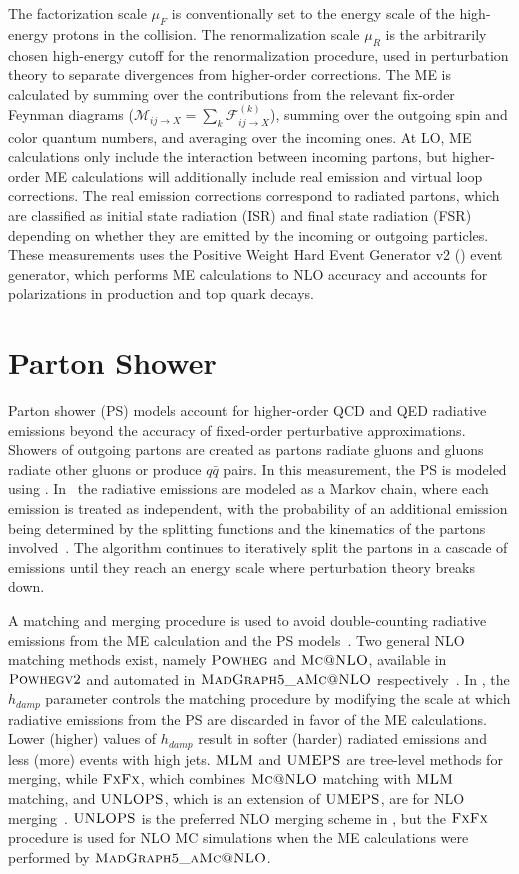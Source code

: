 The factorization scale $\mu_F$ is conventionally set to the energy scale of the high-energy protons in the collision.
The renormalization scale $\mu_R$ is the arbitrarily chosen high-energy cutoff for the renormalization procedure, used in perturbation theory to separate divergences from higher-order corrections.
The ME is calculated by summing over the contributions from the relevant fix-order Feynman diagrams ($\mathcal{M}_{i j \rightarrow X}=\sum_k \mathcal{F}_{i j \rightarrow X}^{(k)}$), summing over the outgoing spin and color quantum numbers, and averaging over the incoming ones.
At LO, ME calculations only include the interaction between incoming partons, but higher-order ME calculations will additionally include real emission and virtual loop corrections.
The real emission corrections correspond to radiated partons, which are classified as initial state radiation (ISR) and final state radiation (FSR) depending on whether they are emitted by the incoming or outgoing particles.
These measurements uses the Positive Weight Hard Event Generator v2 (\Powheg) event generator, which performs ME calculations to NLO accuracy and accounts for polarizations in \ttbar production and top quark decays.

\section{Parton Shower}
Parton shower (PS) models account for higher-order QCD and QED radiative emissions beyond the accuracy of fixed-order perturbative approximations.
Showers of outgoing partons are created as partons radiate gluons and gluons radiate other gluons or produce $q\bar{q}$ pairs.
In this measurement, the PS is modeled using \Pythia.
In \Pythia\ the radiative emissions are modeled as a Markov chain, where each emission is treated as independent, with the probability of an additional emission being determined by the splitting functions and the kinematics of the partons involved~\cite{pythia8.3}.
The algorithm continues to iteratively split the partons in a cascade of emissions until they reach an energy scale where perturbation theory breaks down.

A matching and merging procedure is used to avoid double-counting radiative emissions from the ME calculation and the PS models~\cite{StefanoFrixione_2007}.
Two general NLO matching methods exist, namely $\textsc{Powheg}$ and $\textsc{Mc@NLO}$, available in ${\textsc{Powhegv2}}$ and automated in $\textsc{MadGraph5\_aMc@NLO}$ respectively~\cite{pythia8.3}.
In \Powheg, the $h_{damp}$ parameter controls the matching procedure by modifying the scale at which radiative emissions from the PS are discarded in favor of the ME calculations.
Lower (higher) values of $h_{damp}$ result in softer (harder) radiated emissions and less (more) events with high \pT jets.
$\textsc{MLM}$ and $\textsc{UMEPS}$ are tree-level methods for merging, while $\textsc{FxFx}$, which combines $\textsc{Mc@NLO}$ matching with $\textsc{MLM}$ matching, and $\textsc{UNLOPS}$, which is an extension of $\textsc{UMEPS}$, are for NLO merging~\cite{pythia8.3}.
$\textsc{UNLOPS}$ is the preferred NLO merging scheme in \Pythia, but the $\textsc{FxFx}$ procedure is used for NLO MC simulations when the ME calculations were performed by $\textsc{MadGraph5\_aMc@NLO}$.

